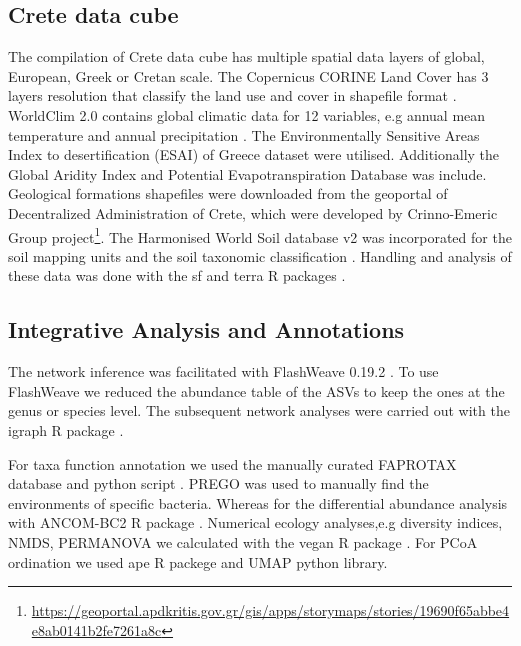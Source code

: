 \subsection{Crete data cube}\label{spatial_data}

The compilation of Crete data cube has multiple spatial data layers of global,
European, Greek or Cretan scale. 
The Copernicus CORINE Land Cover has 3 layers resolution that classify the land
use and cover in shapefile format \parencite{CLC2023}. 
WorldClim 2.0 contains global climatic data for 12 variables, e.g annual mean
temperature and annual precipitation \parencite{Fick2017}.
The Environmentally Sensitive Areas Index to desertification (ESAI) 
of Greece dataset \parencite{KARAMESOUTI2018266} were utilised. Additionally the 
Global Aridity Index and Potential Evapotranspiration Database \parencite{zomer2022version} was include.
Geological formations shapefiles were downloaded from the geoportal of
Decentralized Administration of Crete, which were developed by
Crinno-Emeric Group project\footnote{\url{https://geoportal.apdkritis.gov.gr/gis/apps/storymaps/stories/19690f65abbe4e8ab0141b2fe7261a8c}}.
The Harmonised World Soil database v2 was incorporated for the soil mapping units and 
the soil taxonomic classification \parencite{fao2023}.
Handling and analysis of these data was done with the sf and terra R packages \parencite{Pebesma2023}.

\subsection{Integrative Analysis and Annotations}\label{int_analysis}
The network inference was facilitated with FlashWeave 0.19.2 \parencite{Tackmann2019}.
To use FlashWeave we reduced 
the abundance table of the ASVs to keep the ones at the genus or species level.
The subsequent network analyses were carried out
with the igraph R package \parencite{Csardi2006}.

For taxa function annotation we used the manually curated FAPROTAX database and python script \parencite{loucaDecouplingFunctionTaxonomy2016}.
PREGO \parencite{microorganisms10020293} was used to manually find the environments of specific bacteria.
Whereas for the differential abundance analysis with ANCOM-BC2 R package \parencite{Lin2023}.
Numerical ecology analyses,e.g diversity indices, NMDS, PERMANOVA we calculated
with the vegan R package \parencite{oksanen2024vegan}.
For PCoA ordination we used ape R packege \parencite{Paradis2004} and UMAP python library\parencite{mcinnes2018umap-software}.

